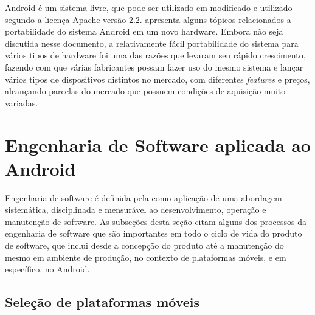 Android é um sistema livre, que pode ser utilizado em modificado e utilizado segundo a licença Apache versão 2.2.  apresenta alguns tópicos relacionados a portabilidade do sistema Android em um novo hardware. Embora não seja discutida nesse documento, a relativamente fácil portabilidade do sistema para vários tipos de hardware foi uma das razões que levaram seu rápido crescimento, fazendo com que várias fabricantes possam fazer uso do mesmo sistema e lançar vários tipos de dispositivos distintos no mercado, com diferentes \textit{features} e preços, alcançando parcelas do mercado que possuem condições de aquisição muito variadas.

\section{Engenharia de Software aplicada ao Android}

Engenharia de software é definida pela \cite{swebok} como aplicação de uma abordagem sistemática, disciplinada e mensurável ao desenvolvimento, operação e manutenção de software. As subseções desta seção citam alguns dos processos da engenharia de software que são importantes em todo o ciclo de vida do produto de software, que inclui desde a concepção do produto até a manutenção do mesmo em ambiente de produção, no contexto de plataformas móveis, e em específico, no Android.

\subsection{Seleção de plataformas móveis}

